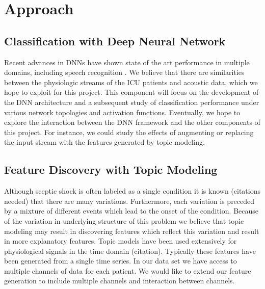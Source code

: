 \documentclass[dvips,12pt]{article}
\begin{document}
\section{Approach}

\subsection{Classification with Deep Neural Network}

Recent advances in DNNs have shown state of the art performance in multiple domains, including speech recognition \cite{hinton2012deep}. We believe that there are similarities between the physiologic streams of the ICU patients and acoustic data, which we hope to exploit for this project. This component will focus on the development of the DNN architecture and a subsequent study of classification performance under various network topologies and activation functions. 
Eventually, we hope to explore the interaction between the DNN framework and the other components of this project. 
For instance, we could study the effects of augmenting or replacing the input stream with the features generated by topic modeling.


\subsection{Feature Discovery with Topic Modeling}

Although sceptic shock is often labeled as a single condition it is known (citations needed) that there are many variations. 
Furthermore, each variation is preceded by a mixture of different events which lead to the onset of the condition. Because of the variation in underlying structure
of this problem we believe that topic modeling may result in discovering features which reflect this variation and result in more explanatory features. Topic models have been used extensively for physiological signals in the time domain (citation). Typically these features have been generated from a single time series. In our data set we have access to multiple channels of data for each patient. We would like to extend our feature generation to include multiple channels and interaction between channels. 
\end{document}
